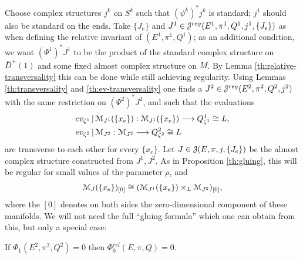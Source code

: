 \documentclass[10pt,letterpaper]{article}
\begin{document}
Choose complex structures $j^k$ on $S^k$ such that $(\psi^k)^*j^k$ is standard;
$j^1$ should also be standard on the ends. Take $\{J_e\}$ and $J^1 \in
\mathcal{J}^{reg}(E^1,\pi^1,Q^1,j^1,\{J_e\})$ as when defining the relative invariant of
$(E^1,\pi^1,Q^1)$; as an additional condition, we want $(\Psi^1)^*J^1$ to be
the product of the standard complex structure on $\bar{D}^+(1)$ and some fixed
almost complex structure on $M$. By Lemma \ref{th:relative-transversality} this
can be done while still achieving regularity. Using Lemmas
\ref{th:transversality} and \ref{th:ev-transversality} one finds a $J^2 \in
\mathcal{J}^{reg}(E^2,\pi^2,Q^2,j^2)$ with the same restriction on $(\Psi^2)^*J^2$, and
such that the evaluations
\begin{equation} \label{eq:two-evaluations}
\begin{split}
 & ev_{\zeta^1}\,|\,\mathcal{M}_{J^1}(\{x_e\}) :
 \mathcal{M}_{J^1}(\{x_e\}) \longrightarrow Q^1_{\zeta^1} \cong L, \\
 & ev_{\zeta^2}\,|\,\mathcal{M}_{J^2}: \mathcal{M}_{J^2} \longrightarrow Q^2_{\zeta^2} \cong L
\end{split}
\end{equation}
are transverse to each other for every $\{x_e\}$. Let $J \in
\mathcal{J}(E,\pi,j,\{J_e\})$ be the almost complex structure constructed from $J^1,
J^2$. As in Proposition \ref{th:gluing}, this will be regular for small values
of the parameter $\rho$, and
\begin{equation} \label{eq:zero-gluing}
\mathcal{M}_J(\{x_e\})_{[0]} \cong (\mathcal{M}_{J^1}(\{x_e\}) \times_L \mathcal{M}_{J^2})_{[0]},
\end{equation}
where the $[0]$ denotes on both sides the zero-dimensional component of these
manifolds. We will not need the full ``gluing formula'' which one can obtain
from this, but only a special case:

\begin{lemma} \label{th:gluing-vanishing}
If $\Phi_1(E^2,\pi^2,Q^2) = 0$ then $\Phi_0^{rel}(E,\pi,Q) = 0$.
\end{lemma}
\end{document}
